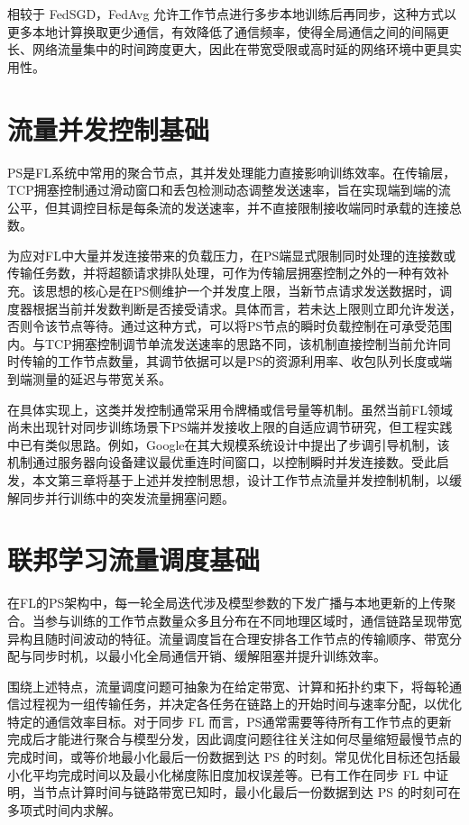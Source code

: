 \documentclass[master, vlined]{DissertUESTC}
\begin{document}
	相较于 FedSGD，FedAvg 允许工作节点进行多步本地训练后再同步，这种方式以更多本地计算换取更少通信，有效降低了通信频率，使得全局通信之间的间隔更长、网络流量集中的时间跨度更大，因此在带宽受限或高时延的网络环境中更具实用性。

	\section{流量并发控制基础}
	\label{sec:concurrency-control}

	PS是FL系统中常用的聚合节点，其并发处理能力直接影响训练效率。在传输层，TCP拥塞控制通过滑动窗口和丢包检测动态调整发送速率，旨在实现端到端的流公平，但其调控目标是每条流的发送速率，并不直接限制接收端同时承载的连接总数。

	为应对FL中大量并发连接带来的负载压力，在PS端显式限制同时处理的连接数或传输任务数，并将超额请求排队处理，可作为传输层拥塞控制之外的一种有效补充。该思想的核心是在PS侧维护一个并发度上限，当新节点请求发送数据时，调度器根据当前并发数判断是否接受请求。具体而言，若未达上限则立即允许发送，否则令该节点等待。通过这种方式，可以将PS节点的瞬时负载控制在可承受范围内。与TCP拥塞控制调节单流发送速率的思路不同，该机制直接控制当前允许同时传输的工作节点数量，其调节依据可以是PS的资源利用率、收包队列长度或端到端测量的延迟与带宽关系。

	在具体实现上，这类并发控制通常采用令牌桶或信号量等机制。虽然当前FL领域尚未出现针对同步训练场景下PS端并发接收上限的自适应调节研究，但工程实践中已有类似思路。例如，Google在其大规模系统设计中提出了步调引导机制，该机制通过服务器向设备建议最优重连时间窗口，以控制瞬时并发连接数。受此启发，本文第三章将基于上述并发控制思想，设计工作节点流量并发控制机制，以缓解同步并行训练中的突发流量拥塞问题。

	\section{联邦学习流量调度基础}
	\label{sec:traffic-scheduling}

	在FL的PS架构中，每一轮全局迭代涉及模型参数的下发广播与本地更新的上传聚合。当参与训练的工作节点数量众多且分布在不同地理区域时，通信链路呈现带宽异构且随时间波动的特征。流量调度旨在合理安排各工作节点的传输顺序、带宽分配与同步时机，以最小化全局通信开销、缓解阻塞并提升训练效率。

	围绕上述特点，流量调度问题可抽象为在给定带宽、计算和拓扑约束下，将每轮通信过程视为一组传输任务，并决定各任务在链路上的开始时间与速率分配，以优化特定的通信效率目标。对于同步 FL 而言，PS通常需要等待所有工作节点的更新完成后才能进行聚合与模型分发，因此调度问题往往关注如何尽量缩短最慢节点的完成时间，或等价地最小化最后一份数据到达 PS 的时刻。常见优化目标还包括最小化平均完成时间以及最小化梯度陈旧度加权误差等。已有工作在同步 FL 中证明，当节点计算时间与链路带宽已知时，最小化最后一份数据到达 PS 的时刻可在多项式时间内求解。
\end{document}

